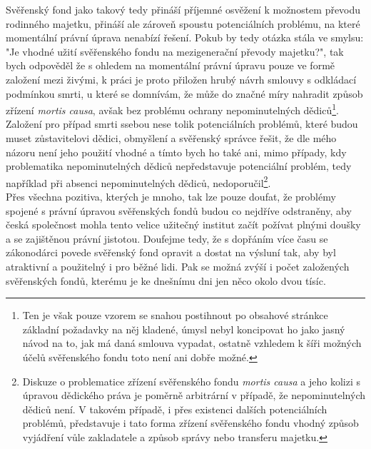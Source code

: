 \documentclass{article}
\begin{document}
Svěřenský fond jako takový tedy přináší příjemné osvěžení k možnostem převodu rodinného majetku, přináší ale zároveň spoustu potenciálních problému, na které momentální právní úprava nenabízí řešení. Pokub by tedy otázka stála ve smylsu: "Je vhodné užití svěřenského fondu na mezigenerační převody majetku?", tak bych odpověděl že s ohledem na momentální právní úpravu pouze ve formě založení mezi živými, k práci je proto přiložen hrubý návrh smlouvy s odkládací podmínkou smrti, u které se domnívám, že může do značné míry nahradit způsob zřízení \textit{mortis causa}, avšak bez problému ochrany nepominutelných dědiců\footnote{Ten je však pouze vzorem se snahou postihnout po obsahové stránkce základní požadavky na něj kladené, úmysl nebyl koncipovat ho jako jasný návod na to, jak má daná smlouva vypadat, ostatně vzhledem k šíři možných účelů svěřenského fondu toto není ani dobře možné.}. Založení pro případ smrti ssebou nese tolik potenciálních problémů, které budou muset zůstavitelovi dědici, obmyšlení a svěřenský správce řešit, že dle mého názoru není jeho použití vhodné a tímto bych ho také ani, mimo případy, kdy problematika nepominutelných dědiců nepředstavuje potenciální problém, tedy například při absenci nepominutelných dědiců, nedoporučil\footnote{Diskuze o problematice zřízení svěřenského fondu \textit{mortis causa} a jeho kolizi s úpravou dědického práva je poměrně arbitrární v případě, že nepominutelných dědiců není. V takovém případě, i přes existenci dalších potenciálních problémů, představuje i tato forma zřízení svěřenského fondu vhodný způsob vyjádření vůle zakladatele a způsob správy nebo transferu majetku.}.\\

Přes všechna pozitiva, kterých je mnoho, tak lze pouze doufat, že problémy spojené s právní úpravou svěřenských fondů budou co nejdříve odstraněny, aby česká společnost mohla tento velice užitečný institut začít požívat plnými doušky a se zajištěnou právní jistotou. Doufejme tedy, že s dopřáním více času se zákonodárci povede svěřenský fond opravit a dostat na výsluní tak, aby byl atraktivní a použitelný i pro běžné lidi. Pak se možná zvýší i počet založených svěřenských fondů, kterému je ke dnešnímu dni jen něco okolo dvou tísíc.\\

\end{document}
